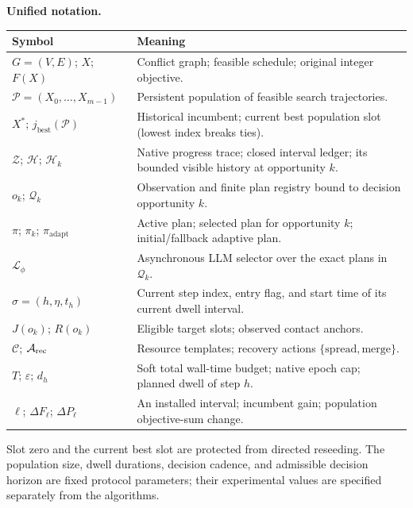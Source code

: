 \documentclass[10pt,a4paper]{article}
\newcommand{\Pop}{\mathcal P}
\newcommand{\Reg}{\mathcal Q}
\newcommand{\Hist}{\mathcal H}
\newcommand{\Trace}{\mathcal Z}
\newcommand{\LLM}{\mathcal L_{\phi}}
\newcommand{\Best}{\operatorname{best}}
\newcommand{\Adapt}{\pi_{\mathrm{adapt}}}
\begin{document}
\textbf{Unified notation.}
\begin{center}\small
\begin{tabularx}{\linewidth}{@{}p{.25\linewidth}X@{}}
\toprule
Symbol & Meaning \\
\midrule
$G=(V,E)$; $X$; $F(X)$ & Conflict graph; feasible schedule; original integer objective.\\
$\Pop=(X_0,\ldots,X_{m-1})$ & Persistent population of feasible search trajectories.\\
$X^*$; $j_{\Best}(\Pop)$ & Historical incumbent; current best population slot (lowest index breaks ties).\\
$\Trace$; $\Hist$; $\Hist_k$ & Native progress trace; closed interval ledger; its bounded visible history at opportunity $k$.\\
$o_k$; $\Reg_k$ & Observation and finite plan registry bound to decision opportunity $k$.\\
$\pi$; $\pi_k$; $\Adapt$ & Active plan; selected plan for opportunity $k$; initial/fallback adaptive plan.\\
$\LLM$ & Asynchronous LLM selector over the exact plans in $\Reg_k$.\\
$\sigma=(h,\eta,t_h)$ & Current step index, entry flag, and start time of its current dwell interval.\\
$J(o_k)$; $R(o_k)$ & Eligible target slots; observed contact anchors.\\
$\mathcal C$; $\mathcal A_{\rm rec}$ & Resource templates; recovery actions $\{\mathrm{spread},\mathrm{merge}\}$.\\
$T$; $\varepsilon$; $d_h$ & Soft total wall-time budget; native epoch cap; planned dwell of step $h$.\\
$\ell$; $\Delta F_\ell$; $\Delta P_\ell$ & An installed interval; incumbent gain; population objective-sum change.\\
\bottomrule
\end{tabularx}
\end{center}
Slot zero and the current best slot are protected from directed reseeding.
The population size, dwell durations, decision cadence, and admissible
decision horizon are fixed protocol parameters; their experimental values
are specified separately from the algorithms.
\end{document}
